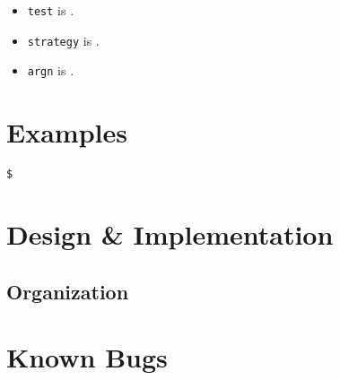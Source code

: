 \documentclass[paper=a4, fontsize=11pt]{scrartcl}
\begin{document}
\begin{itemize}
  \item \texttt{test} is .

  \item \texttt{strategy} is .

  \item \texttt{argn} is .
\end{itemize}


\section*{Examples}
\begin{lstlisting}[style=ShellStyle]$
\end{lstlisting}

\section*{Design \& Implementation}
\subsection*{Organization}




\section*{Known Bugs}
\end{document}
